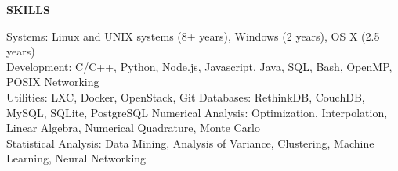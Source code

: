 \textbf{SKILLS} \\
\vspace{5pt}

Systems: Linux and UNIX systems (8+ years), Windows (2 years), OS X (2.5 years) \\
\vspace{2pt}
Development: C/C++, Python, Node.js, Javascript, Java, SQL, Bash, OpenMP, POSIX Networking \\
\vspace{2pt}
Utilities: LXC, Docker, OpenStack, Git
\vspace{2pt}
Databases: RethinkDB, CouchDB, MySQL, SQLite, PostgreSQL
\vspace{2pt}
Numerical Analysis: Optimization, Interpolation, Linear Algebra, Numerical Quadrature, Monte Carlo \\
\vspace{2pt}
Statistical Analysis: Data Mining, Analysis of Variance, Clustering, Machine Learning, Neural Networking \\
\vspace{2pt}

